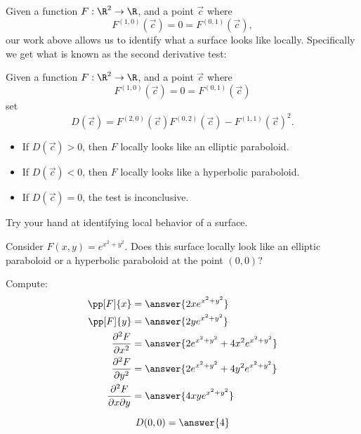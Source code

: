 \documentclass{ximera}
\begin{document}
Given a function $F:\R^2\to \R$, and a point $\vec{c}$ where
\[
F^{(1,0)}(\vec{c}) = 0 = F^{(0,1)}(\vec{c}),
\]
our work above allows us to identify what a surface looks like
locally. Specifically we get what is known as the second derivative test:

\begin{theorem}
  Given a function $F:\R^2\to \R$, and a point $\vec{c}$ where
  \[
  F^{(1,0)}(\vec{c}) = 0 = F^{(0,1)}(\vec{c}) 
  \]
  set
  \[
  D(\vec{c}) = F^{(2,0)}(\vec{c})F^{(0,2)}(\vec{c})-F^{(1,1)}(\vec{c})^2.
  \]
  \begin{itemize}
  \item If $D(\vec{c})>0$, then $F$ locally looks like an elliptic paraboloid.
  \item	If $D(\vec{c})<0$, then $F$ locally looks like a hyperbolic paraboloid.
  \item If $D(\vec{c})=0$, the test is inconclusive.
  \end{itemize}
\end{theorem}

Try your hand at identifying local behavior of a surface.



\begin{question}
  Consider $F(x,y) = e^{x^2+y^2}$. Does this surface locally look like
  an elliptic paraboloid or a hyperbolic paraboloid at the point
  $(0,0)$?
  \begin{prompt}
    Compute:
    \begin{align*}
      \pp[F]{x} &= \answer{2x e^{x^2+y^2}}\\
      \pp[F]{y} &= \answer{2y e^{x^2+y^2}}\\
      \frac{\partial^2F}{\partial x^2} &= \answer{2 e^{x^2+y^2}+4x^2 e^{x^2+y^2}}\\
      \frac{\partial^2F}{\partial y^2} &= \answer{2 e^{x^2+y^2}+4y^2 e^{x^2+y^2}}\\
      \frac{\partial^2F}{\partial x\partial y} &= \answer{4 x y e^{x^2+y^2}}\\
    \end{align*}
    \begin{question}
      \[
      D(0,0) = \answer{4}
      \]
      \begin{question}
        \begin{multipleChoice}
        \end{multipleChoice}
      \end{question}
    \end{question}
  \end{prompt}
\end{question}
\end{document}
